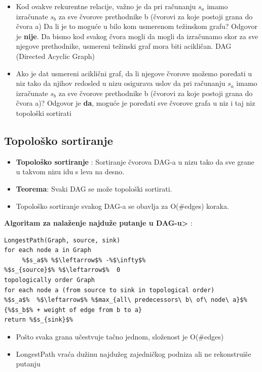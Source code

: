 \begin{itemize}
    \item Kod ovakve rekurentne relacije, važno je da pri računanju $s_a$ imamo izračunate $s_b$ za sve čvorove prethodnike b (čvorovi za koje
postoji grana do čvora a) Da li je to moguće u bilo kom usmerenom
težinskom grafu? Odgovor je \textbf{nije}. Da bismo kod svakog čvora mogli da mogli da izračunamo skor za sve njegove prethodnike, usmereni težinski graf mora biti acikličan. DAG (Directed Acyclic Graph) 
    \item Ako je dat usmereni aciklični graf, da li njegove čvorove možemo poređati u niz tako da njihov redosled u nizu osigurava uslov da pri računanju $s_a$ imamo izračunate $s_b$ za sve čvorove prethodnike b (čvorovi za koje postoji grana do čvora a)? Odgovor je \textbf{da}, moguće je poređati sve čvorove grafa u niz i taj niz topološki sortirati
\end{itemize}




\subsection{Topološko sortiranje}

\begin{itemize}
    \item \textbf{Topološko sortiranje} : Sortiranje čvorova DAG-a u nizu tako da sve grane u takvom nizu idu s leva na desno.
    \item \textbf{ Teorema}: Svaki DAG se može topološki sortirati.
    \item Topološko sortiranje svakog DAG-a se obavlja za O(\#edges) koraka.
\end{itemize}

\textbf{Algoritam za nalaženje najduže putanje u DAG-u>} :

\begin{lstlisting}
LongestPath(Graph, source, sink)
for each node a in Graph
     %$s_a$% %$\leftarrow$% -%$\infty$%
%$s_{source}$% %$\leftarrow$%  0
topologically order Graph
for each node a (from source to sink in topological order)
%$s_a$%  %$\leftarrow$% %$max_{all\ predecessors\ b\ of\ node\ a}$% {%$s_b$% + weight of edge from b to a}
return %$s_{sink}$%
\end{lstlisting}


\begin{itemize}
    \item Pošto svaka grana učestvuje tačno jednom, složenost je O(\#edges)
    \item LongestPath vraća dužinu najdužeg zajedničkog podniza ali ne rekonstruiše putanju
\end{itemize}

